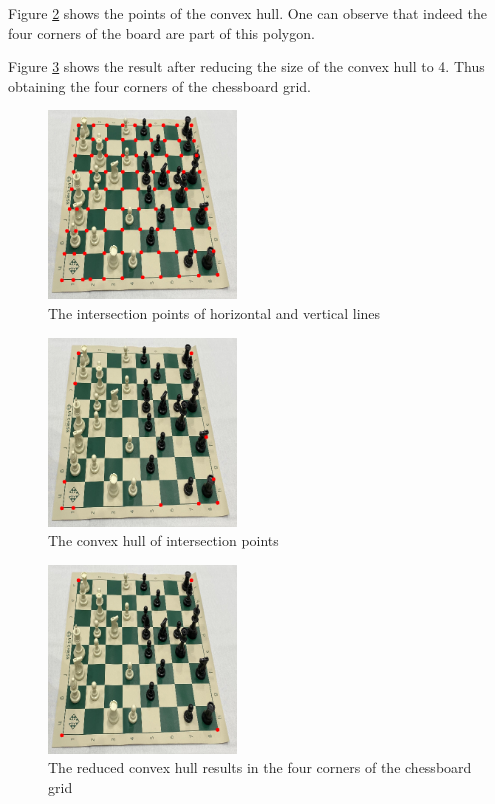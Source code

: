 \documentclass[conference]{IEEEtran}
\begin{document}
Figure \ref{fig:img-conex-hull} shows the points of the convex hull. One can observe that indeed the four corners of the board are part of this polygon.

Figure \ref{fig:img-board-corners} shows the result after reducing the size of the convex hull to 4. Thus obtaining the four corners of the chessboard grid.


\begin{figure}[bt] 
    \centering
    \includegraphics[width=5cm]{Figures/Intersection points.png}
    \caption{The intersection points of horizontal and vertical lines}
    \label{fig:img-intersection}
\end{figure}

\begin{figure}[bt] 
    \centering
    \includegraphics[width=5cm]{Figures/Convex hull of intersection points.png}
    \caption{The convex hull of intersection points}
    \label{fig:img-conex-hull}
\end{figure}

\begin{figure}[bt] 
    \centering
    \includegraphics[width=5cm]{Figures/Intersection corners.png}
    \caption{The reduced convex hull results in the four corners of the chessboard grid}
    \label{fig:img-board-corners}
\end{figure}
\end{document}
